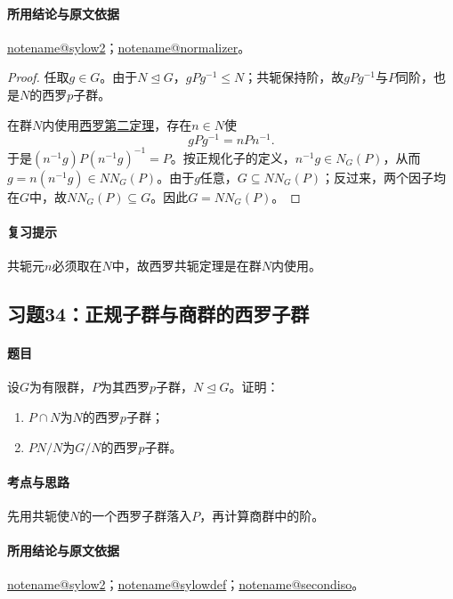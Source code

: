 \documentclass[UTF8,a4paper,11pt,fontset=windows]{ctexart}
\makeatletter
\newcommand{\noteref}[1]{\hyperref[note:#1]{\csname notename@#1\endcsname}}
\newcommand{\proofref}[2]{\hyperref[note:#1]{#2}}
\newcommand{\exref}[2]{\hyperref[ex:#1:#2]{第#1章习题#2}}
\makeatother
\begin{document}
\paragraph{所用结论与原文依据}
\noteref{sylow2}；\noteref{normalizer}。


\begin{proof}
任取$g\in G$。由于$N\trianglelefteq G$，$gPg^{-1}\leq N$；共轭保持阶，故$gPg^{-1}$与$P$同阶，也是$N$的西罗$p$子群。

在群$N$内使用\proofref{sylow2}{西罗第二定理}，存在$n\in N$使
\[
gPg^{-1}=nPn^{-1}.
\]
于是$(n^{-1}g)P(n^{-1}g)^{-1}=P$。按正规化子的定义，$n^{-1}g\in N_G(P)$，从而$g=n(n^{-1}g)\in NN_G(P)$。由于$g$任意，$G\subseteq NN_G(P)$；反过来，两个因子均在$G$中，故$NN_G(P)\subseteq G$。因此$G=NN_G(P)$。
\end{proof}

\paragraph{复习提示}
共轭元$n$必须取在$N$中，故西罗共轭定理是在群$N$内使用。


\subsection{习题34：\texorpdfstring{正规子群与商群的西罗子群}{正规子群与商群的西罗子群}}
\label{ex:2:34}

\paragraph{题目}
设$G$为有限群，$P$为其西罗$p$子群，$N\trianglelefteq G$。证明：
\begin{enumerate}
\item $P\cap N$为$N$的西罗$p$子群；
\item $PN/N$为$G/N$的西罗$p$子群。
\end{enumerate}

\paragraph{考点与思路}
先用共轭使$N$的一个西罗子群落入$P$，再计算商群中的阶。

\paragraph{所用结论与原文依据}
\noteref{sylow2}；\noteref{sylowdef}；\noteref{secondiso}。
\end{document}
